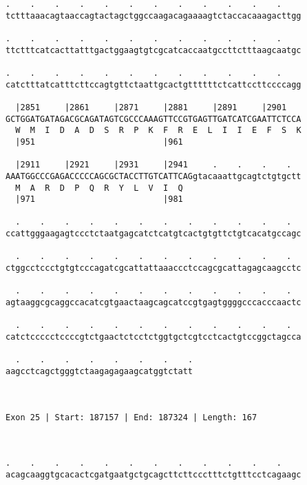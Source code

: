 \documentclass{article}
\begin{document}
\begin{Verbatim}
.    .    .    .    .    .    .    .    .    .    .    .    
tctttaaacagtaaccagtactagctggccaagacagaaaagtctaccacaaagacttgg
                                                            
.    .    .    .    .    .    .    .    .    .    .    .    
ttctttcatcacttatttgactggaagtgtcgcatcaccaatgccttctttaagcaatgc
                                                            
.    .    .    .    .    .    .    .    .    .    .    .    
catctttatcatttcttccagtgttctaattgcactgttttttctcattccttccccagg
                                                            
  |2851     |2861     |2871     |2881     |2891     |2901   
GCTGGATGATAGACGCAGATAGTCGCCCAAAGTTCCGTGAGTTGATCATCGAATTCTCCA
  W  M  I  D  A  D  S  R  P  K  F  R  E  L  I  I  E  F  S  K
  |951                          |961                        
  
  |2911     |2921     |2931     |2941     .    .    .    .  
AAATGGCCCGAGACCCCCAGCGCTACCTTGTCATTCAGgtacaaattgcagtctgtgctt
  M  A  R  D  P  Q  R  Y  L  V  I  Q                        
  |971                          |981                        
  
  .    .    .    .    .    .    .    .    .    .    .    .  
ccattgggaagagtccctctaatgagcatctcatgtcactgtgttctgtcacatgccagc
                                                            
  .    .    .    .    .    .    .    .    .    .    .    .  
ctggcctccctgtgtcccagatcgcattattaaaccctccagcgcattagagcaagcctc
                                                            
  .    .    .    .    .    .    .    .    .    .    .    .  
agtaaggcgcaggccacatcgtgaactaagcagcatccgtgagtggggcccacccaactc
                                                            
  .    .    .    .    .    .    .    .    .    .    .    .  
catctccccctccccgtctgaactctcctctggtgctcgtcctcactgtccggctagcca
                                                            
  .    .    .    .    .    .    .    .
aagcctcagctgggtctaagagagaagcatggtctatt
                                      
                                      
 
Exon 25 | Start: 187157 | End: 187324 | Length: 167



.    .    .    .    .    .    .    .    .    .    .    .    
acagcaaggtgcacactcgatgaatgctgcagcttcttccctttctgtttcctcagaagc
                                                            

\end{Verbatim}
\end{document}
